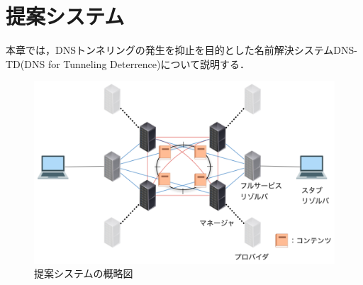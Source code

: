 \section{提案システム}
本章では，DNSトンネリングの発生を抑止を目的とした名前解決システムDNS-TD(DNS for Tunneling Deterrence)について説明する．
\begin{figure}[h]
 \centering
 \label{fig:abstruct-DNS-TD-architecture}
 \includegraphics[scale=0.6]{figure/new-architecture-DNS-TD.png}
 \caption{提案システムの概略図}
\end{figure}

